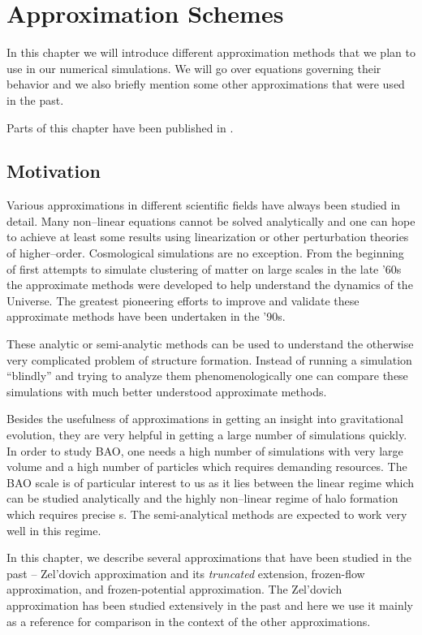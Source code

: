 \chapter{Approximation Schemes}
\label{chpt:app_schemes}
In this chapter we will introduce different approximation methods that we plan to use in our numerical simulations. We will go over equations governing their behavior and we also briefly mention some other approximations that were used in the past.

Parts of this chapter have been published in \textcite{2020MNRAS.493.2085V}.

\section{Motivation}
Various approximations in different scientific fields have always been studied in detail. Many non--linear equations cannot be solved analytically and one can hope to achieve at least some results using linearization or other perturbation theories of higher--order. Cosmological simulations are no exception. From the beginning of first attempts to simulate clustering of matter on large scales in the late '60s the approximate methods were developed to help understand the dynamics of the Universe. The greatest pioneering efforts to improve and validate these approximate methods have been undertaken in the '90s.

These analytic or semi-analytic methods can be used to understand the otherwise very complicated problem of structure formation. Instead of running a simulation ``blindly'' and trying to analyze them phenomenologically one can compare these simulations with much better understood approximate methods.

Besides the usefulness of approximations in getting an insight into gravitational evolution, they are very helpful in getting a large number of simulations quickly. In order to study BAO, one needs a high number of simulations with very large volume and a high number of particles which requires demanding resources. The BAO scale is of particular interest to us as it lies between the linear regime which can be studied analytically and the highly non--linear regime of halo formation which requires precise \nbodysim s. The semi-analytical methods are expected to work very well in this regime.

In this chapter, we describe several approximations that have been studied in the past -- Zel'dovich approximation and its \textit{truncated} extension, frozen-flow approximation, and frozen-potential approximation. The Zel'dovich approximation has been studied extensively in the past and here we use it mainly as a reference for comparison in the context of the other approximations.


